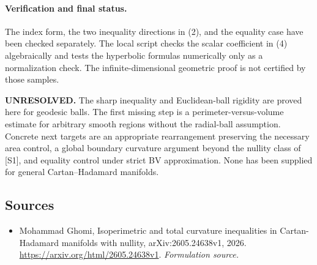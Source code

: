 \documentclass[11pt]{article}
\begin{document}
\paragraph{Verification and final status.}
The index form, the two inequality directions in (2), and the equality
case have been checked separately. The local script checks the scalar
coefficient in (4) algebraically and tests the hyperbolic formulas
numerically only as a normalization check. The infinite-dimensional
geometric proof is not certified by those samples.

\textbf{UNRESOLVED.} The sharp inequality and Euclidean-ball rigidity
are proved here for geodesic balls. The first missing step is a
perimeter-versus-volume estimate for arbitrary smooth regions without
the radial-ball assumption. Concrete next targets are an appropriate
rearrangement preserving the necessary area control, a global boundary
curvature argument beyond the nullity class of [S1], and equality
control under strict BV approximation. None has been supplied for
general Cartan--Hadamard manifolds.

\subsection{Sources}
\begin{itemize}
\item[S1]Mohammad Ghomi, Isoperimetric and total curvature inequalities in Cartan-Hadamard manifolds with nullity, arXiv:2605.24638v1, 2026.
\url{https://arxiv.org/html/2605.24638v1}.
\textit{Formulation source.}
\end{itemize}
\end{document}
